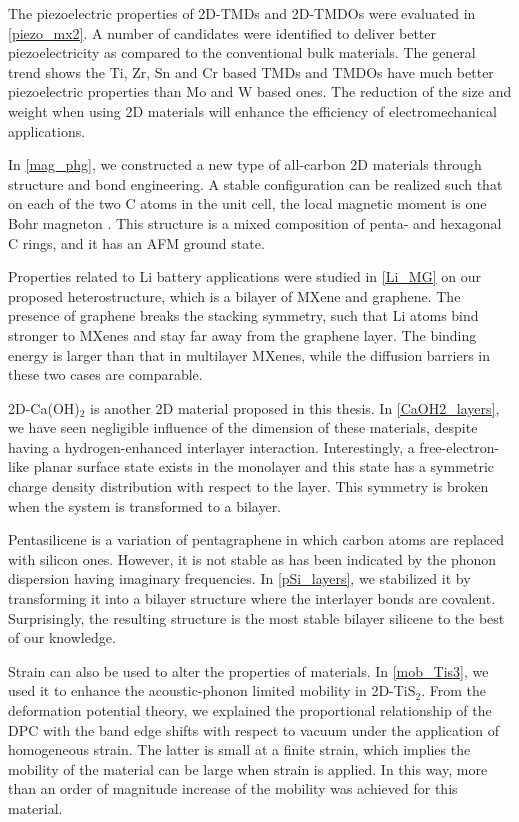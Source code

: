The piezoelectric properties of 2D-TMDs and 2D-TMDOs were evaluated in \autoref{piezo_mx2}. A number of candidates were identified to deliver better piezoelectricity as compared to the conventional bulk materials. The general trend shows the Ti,  Zr, Sn and Cr based TMDs and TMDOs have much better piezoelectric properties than Mo and W based ones. The reduction of the size and weight when using 2D materials will enhance the efficiency of electromechanical applications.

In \autoref{mag_phg}, we constructed a new type of all-carbon 2D materials through structure and bond engineering. A stable configuration can be realized such that on each of the two C atoms in the unit cell, the local magnetic moment is one Bohr magneton . This structure is a mixed composition of penta- and hexagonal C rings, and it has an AFM ground state.

Properties related to Li battery applications were studied in \autoref{Li_MG} on our proposed heterostructure, which is a bilayer of MXene and graphene. The presence of graphene breaks the stacking symmetry, such that Li atoms bind stronger to MXenes and stay far away from the graphene layer. The binding energy is larger than that in multilayer MXenes, while the diffusion barriers in these two cases are comparable. 

2D-Ca(OH)$_2$ is another 2D material proposed in this thesis. In \autoref{CaOH2_layers}, we have seen negligible influence of the dimension of these materials, despite having a hydrogen-enhanced interlayer interaction. Interestingly, a free-electron-like planar surface state exists in the monolayer and this state has a symmetric charge density distribution with respect to the layer. This symmetry is broken when the system is transformed to a bilayer.

Pentasilicene is a variation of pentagraphene in which carbon atoms are replaced with silicon ones. However, it is not stable as has been indicated by the phonon dispersion having imaginary frequencies. In \autoref{pSi_layers}, we stabilized it by transforming it into a bilayer structure where the interlayer bonds are covalent. Surprisingly, the resulting structure is the most stable bilayer silicene to the best of our knowledge.

Strain can also be used to alter the properties of materials. In \autoref{mob_Tis3}, we used it to enhance the acoustic-phonon limited mobility in 2D-TiS$_2$. From the deformation potential theory, we explained the proportional relationship of the DPC with the band edge shifts with respect to vacuum under the application of homogeneous strain. The latter is small at a finite strain, which implies the mobility of the material can be large when strain is applied. In this way, more than an order of magnitude increase of the mobility was achieved for this material.

